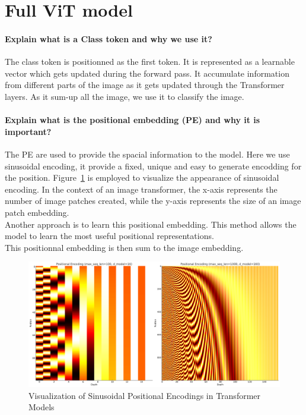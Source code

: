 \section{Full ViT model}

\paragraph{Explain what is a Class token and why we use it?}
The class token is positionned as the first token. It is represented as a learnable vector which gets updated during the forward pass. It accumulate information from different parts of the image as it gets updated through the Transformer layers. As it sum-up all the image, we use it to classify the image.

\paragraph{Explain what is the positional embedding (PE) and why it is important?}
The PE are used to provide the spacial information to the model. Here we use sinusoidal encoding, it provide a fixed, unique and easy to generate encodding for the position. Figure~\ref{fig:pe_viz} is employed to visualize the appearance of sinusoidal encoding. In the context of an image transformer, the x-axis represents the number of image patches created, while the y-axis represents the size of an image patch embedding.  \\
Another approach is to learn this positional embedding. This method allows the model to learn the most useful positional representations. \\
This positionnal embedding is then sum to the image embedding.

\begin{figure}[H]
    \centering
    \includegraphics*[width=.75\textwidth]{figs/Transformers/positional_encoding_subplot.pdf}
    \caption{Visualization of Sinusoidal Positional Encodings in Transformer Models}
    \label{fig:pe_viz}
\end{figure}

